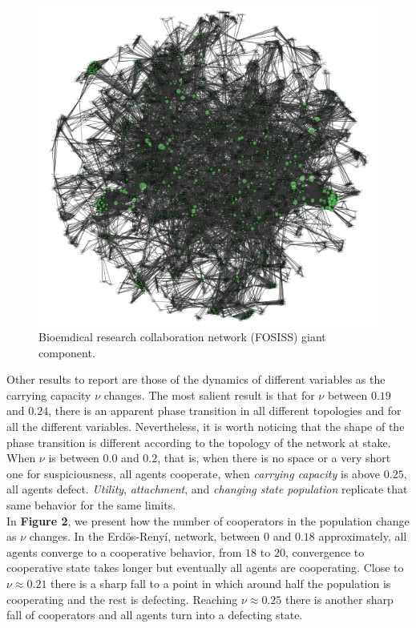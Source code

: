 \documentclass[11pt]{article}
\begin{document}
\begin{figure} [h!]
\centering
\includegraphics[scale=0.5]{images/Fosiss_GC_final.png}
\caption{Bioemdical research collaboration network (FOSISS) giant component.}\label{Fosiss_GC}
\end{figure}

\FloatBarrier

Other results to report are those of the dynamics of different
variables as the carrying capacity $\nu$ changes. The  most salient
result is that for $\nu$ between $0.19$ and $0.24$, there is an
apparent phase transition in all different topologies and for all the
different variables. Nevertheless, it is worth noticing that the shape
of the phase transition is different according to the topology of the
network at stake. When $\nu$ is between $0.0$ and $0.2$, that is, when there is
no space or a very short one for suspiciousness, all agents cooperate, when
\textit{carrying capacity} is above $0.25$, all agents defect. \textit{Utility},
\textit{attachment}, and \textit{changing state population}
replicate that same behavior for the same limits. \\ 

In \textbf{Figure 2}, we present how the number of cooperators in the population
change as $\nu$ changes. In the Erd\"{o}s-Reny\'i, network, between $0$ and
$0.18$ approximately, all agents converge to a cooperative behavior, from $18$
to $20$, convergence to cooperative state takes longer but eventually all agents
are cooperating. Close to $\nu \approx 0.21$ there is a sharp fall to a point in
which around half the population is cooperating and the rest is
defecting. Reaching $\nu \approx 0.25$ there is another sharp fall of
cooperators and all agents turn into a defecting state.\\
\end{document}

